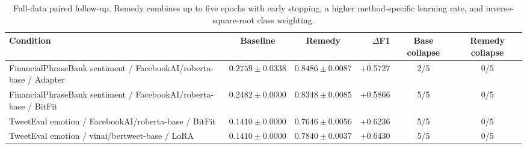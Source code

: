 \begin{table}[t]
\centering\small
\caption{Full-data paired follow-up. Remedy combines up to five epochs with early stopping, a higher method-specific learning rate, and inverse-square-root class weighting.}
\label{tab:full-collapse-followup}
\begin{tabular}{lccrcc}
\toprule
Condition & Baseline & Remedy & $\Delta$F1 & Base collapse & Remedy collapse \\
\midrule
FinancialPhraseBank sentiment / FacebookAI/roberta-base / Adapter & $0.2759 \pm 0.0338$ & $0.8486 \pm 0.0087$ & +0.5727 & 2/5 & 0/5 \\
FinancialPhraseBank sentiment / FacebookAI/roberta-base / BitFit & $0.2482 \pm 0.0000$ & $0.8348 \pm 0.0085$ & +0.5866 & 5/5 & 0/5 \\
TweetEval emotion / FacebookAI/roberta-base / BitFit & $0.1410 \pm 0.0000$ & $0.7646 \pm 0.0056$ & +0.6236 & 5/5 & 0/5 \\
TweetEval emotion / vinai/bertweet-base / LoRA & $0.1410 \pm 0.0000$ & $0.7840 \pm 0.0037$ & +0.6430 & 5/5 & 0/5 \\
\bottomrule
\end{tabular}
\end{table}
